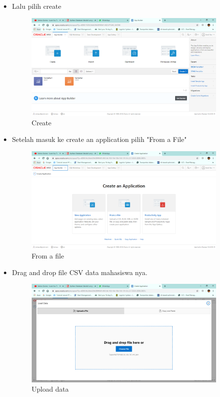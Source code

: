\begin{itemize}
    \newpage
    
    \item Lalu pilih create
    \begin{figure}[!htbp]
        \centering
        \includegraphics[width=10cm]{figures/4.PNG}
        \caption{Create}
    \end{figure}
    
    \item Setelah masuk ke create an application pilih "From a File"
    \begin{figure}[!htbp]
        \centering
        \includegraphics[width=10cm]{figures/5.PNG}
        \caption{From a file}
    \end{figure}
    
    \newpage
    
    \item Drag and drop file CSV data mahasiswa nya. 
    \begin{figure}[!htbp]
        \centering
        \includegraphics[width=10cm]{figures/6.PNG}
        \caption{Upload data}
    \end{figure}
    

\end{itemize}
